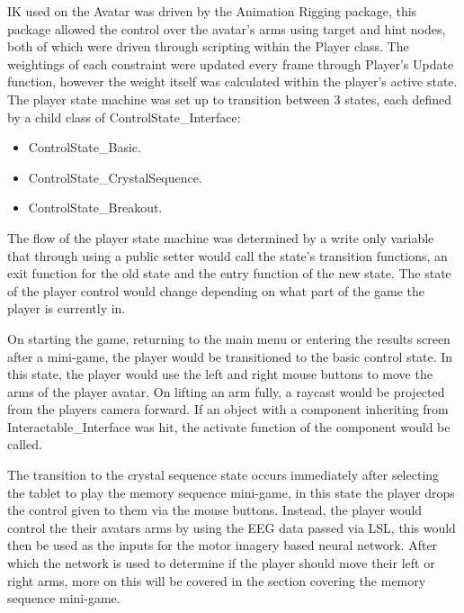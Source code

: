 \documentclass[11pt, a4paper]{article}
\begin{document}
\pagebreak

IK used on the Avatar was driven by the Animation Rigging package, this package allowed the control over the avatar's arms using target and hint nodes, both of which were driven through scripting within the Player class. The weightings of each constraint were updated every frame through Player's Update function, however the weight itself was calculated within the player's active state. The player state machine was set up to transition between 3 states, each defined by a child class of ControlState\_Interface:

\begin{itemize}
  \item ControlState\_Basic.
  \item ControlState\_CrystalSequence.
  \item ControlState\_Breakout.
\end{itemize}

The flow of the player state machine was determined by a write only variable that through using a public setter would call the state's transition functions, an exit function for the old state and the entry function of the new state. The state of the player control would change depending on what part of the game the player is currently in. 

\hfill

On starting the game, returning to the main menu or entering the results screen after a mini-game, the player would be transitioned to the basic control state. In this state, the player would use the left and right mouse buttons to move the arms of the player avatar. On lifting an arm fully, a raycast would be projected from the players camera forward. If an object with a component inheriting from Interactable\_Interface was hit, the activate function of the component would be called. 

\hfill

The transition to the crystal sequence state occurs immediately after selecting the tablet to play the memory sequence mini-game, in this state the player drops the control given to them via the mouse buttons. Instead, the player would control the their avatars arms by using the EEG data passed via LSL, this would then be used as the inputs for the motor imagery based neural network. After which the network is used to determine if the player should move their left or right arms, more on this will be covered in the section covering the memory sequence mini-game.

\hfill
\end{document}
